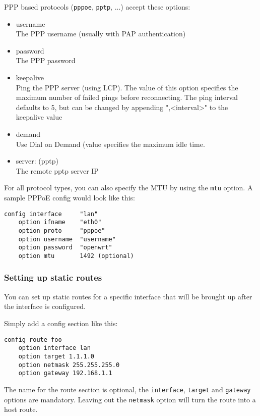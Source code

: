 PPP based protocols (\texttt{pppoe}, \texttt{pptp}, ...) accept these options:
\begin{itemize}
    \item{username} \\
        The PPP username (usually with PAP authentication)
    \item{password} \\
        The PPP password
    \item{keepalive} \\
        Ping the PPP server (using LCP). The value of this option
        specifies the maximum number of failed pings before reconnecting.
        The ping interval defaults to 5, but can be changed by appending
        ",<interval>" to the keepalive value
    \item{demand} \\
        Use Dial on Demand (value specifies the maximum idle time.

    \item{server: (pptp)} \\
        The remote pptp server IP
\end{itemize}

For all protocol types, you can also specify the MTU by using the \texttt{mtu} option.
A sample PPPoE config would look like this:

\begin{Verbatim}
config interface     "lan"
    option ifname    "eth0"
    option proto     "pppoe"
    option username  "username"
    option password  "openwrt"
    option mtu	     1492 (optional)
\end{Verbatim}

\subsubsection{Setting up static routes}

You can set up static routes for a specific interface that will be brought up 
after the interface is configured.

Simply add a config section like this:

\begin{Verbatim}
config route foo
	option interface lan
	option target 1.1.1.0
	option netmask 255.255.255.0
	option gateway 192.168.1.1
\end{Verbatim}

The name for the route section is optional, the \texttt{interface}, \texttt{target} and 
\texttt{gateway} options are mandatory.
Leaving out the \texttt{netmask} option will turn the route into a host route.

